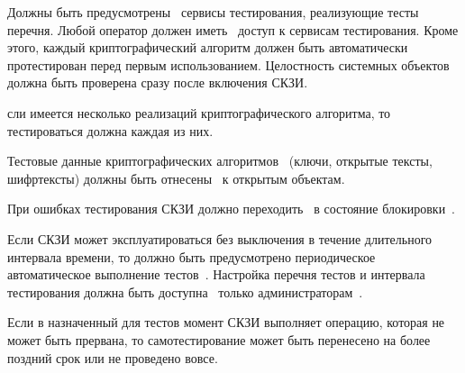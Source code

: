 Должны быть предусмотрены~ сервисы тестирования, реализующие 
тесты перечня. Любой оператор должен иметь~ доступ к 
сервисам тестирования.
%
Кроме этого, каждый криптографический алгоритм должен быть автоматически 
протестирован перед первым использованием.
%
Целостность системных объектов должна быть проверена сразу после включения 
СКЗИ.

\begin{note*}
сли имеется несколько реализаций криптографического алгоритма,  
то тестироваться должна каждая из них.
\end{note*}

\label{R.ST.TestData} %
Тестовые данные криптографических алгоритмов~ 
(ключи, открытые тексты, шифртексты) 
должны быть отнесены~ к открытым объектам.

\label{R.ST.TestLock} %
При ошибках тестирования СКЗИ должно переходить~ 
в состояние блокировки~.


\label{R.ST.Periodic} %
Если СКЗИ может эксплуатироваться без выключения в течение длительного интервала
времени, то должно быть предусмотрено периодическое автоматическое выполнение 
тестов~. Настройка перечня тестов и интервала тестирования
должна быть доступна~ только 
администраторам~.

\begin{note}
Если в назначенный для тестов момент СКЗИ выполняет операцию, которая не может 
быть прервана, то самотестирование может быть перенесено на более поздний срок
или не проведено вовсе.
%
\end{note} 
